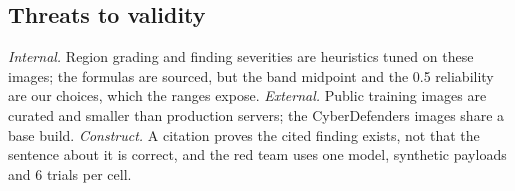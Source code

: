 \subsection{Threats to validity}
\textit{Internal.} Region grading and finding severities are heuristics tuned on these images; the formulas are
sourced, but the band midpoint and the 0.5 reliability are our choices, which the ranges expose.
\textit{External.} Public training images are curated and smaller than production servers; the CyberDefenders
images share a base build. \textit{Construct.} A citation proves the cited finding exists, not that the sentence
about it is correct, and the red team uses one model, synthetic payloads and 6 trials per cell.
